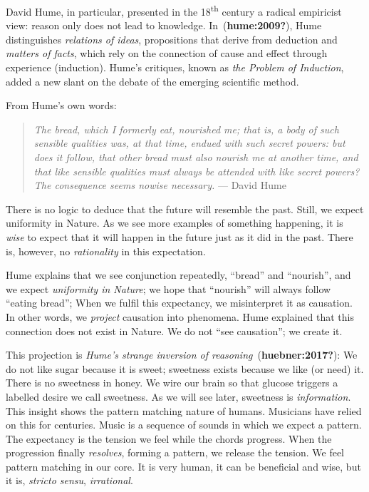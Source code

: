 \documentclass[
  letterpaper,
  DIV=11,
  numbers=noendperiod,
  oneside]{scrreprt}
\begin{document}
David Hume, in particular, presented in the 18\textsuperscript{th}
century a radical empiricist view: reason only does not lead to
knowledge. In~(\textbf{hume:2009?}), Hume distinguishes \emph{relations
of ideas}, propositions that derive from deduction and \emph{matters of
facts}, which rely on the connection of cause and effect through
experience (induction). Hume's critiques, known as \emph{the Problem of
Induction}, added a new slant on the debate of the emerging scientific
method.

From Hume's own words:

\begin{quote}
\emph{The bread, which I formerly eat, nourished me; that is, a body of
such sensible qualities was, at that time, endued with such secret
powers: but does it follow, that other bread must also nourish me at
another time, and that like sensible qualities must always be attended
with like secret powers? The consequence seems nowise necessary.} ---
David Hume
\end{quote}

There is no logic to deduce that the future will resemble the past.
Still, we expect uniformity in Nature. As we see more examples of
something happening, it is \emph{wise} to expect that it will happen in
the future just as it did in the past. There is, however, no
\emph{rationality} in this expectation.

Hume explains that we see conjunction repeatedly, ``bread'' and
``nourish'', and we expect \emph{uniformity in Nature}; we hope that
``nourish'' will always follow ``eating bread''; When we fulfil this
expectancy, we misinterpret it as causation. In other words, we
\emph{project} causation into phenomena. Hume explained that this
connection does not exist in Nature. We do not ``see causation''; we
create it.

This projection is \emph{Hume's strange inversion of
reasoning}~(\textbf{huebner:2017?}): We do not like sugar because it is
sweet; sweetness exists because we like (or need) it. There is no
sweetness in honey.\protect\hypertarget{honey}{}{} We wire our brain so
that glucose triggers a labelled desire we call sweetness. As we will
see later, sweetness is \emph{information}. This insight shows the
pattern matching nature of humans. Musicians have relied on this for
centuries. Music is a sequence of sounds in which we expect a pattern.
The expectancy is the tension we feel while the chords progress. When
the progression finally \emph{resolves}, forming a pattern, we release
the tension. We feel pattern matching in our core. It is very human, it
can be beneficial and wise, but it is, \emph{stricto sensu},
\emph{irrational}.
\end{document}
